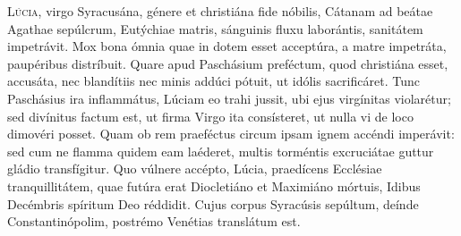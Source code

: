 \lettrine{L}{úcia}, virgo Syracusána,
génere et christiána fide nóbilis,
Cátanam ad beátae Agathae sepúlcrum,
Eutýchiae matris, sánguinis fluxu laborántis,
sanitátem impetrávit.
Mox bona ómnia quae in dotem esset acceptúra,
a matre impetráta, paupéribus distríbuit.
Quare apud Paschásium preféctum, quod christiána esset, accusáta,
nec blandítiis nec minis addúci pótuit, ut idólis sacrificáret.
Tunc Paschásius ira inflammátus, Lúciam eo trahi jussit,
ubi ejus virgínitas violarétur;
sed divínitus factum est, ut firma Virgo ita consísteret,
ut nulla vi de loco dimovéri posset.
Quam ob rem praeféctus circum ipsam ignem accéndi imperávit:
sed cum ne flamma quidem eam laéderet,
multis torméntis excruciátae guttur gládio transfígitur.
Quo vúlnere accépto, Lúcia, praedícens Ecclésiae tranquillitátem,
quae futúra erat Diocletiáno et Maximiáno mórtuis,
Idibus Decémbris spíritum Deo réddidit.
Cujus corpus Syracúsis sepúltum,
deínde Constantinópolim, postrémo Venétias translátum est.

\parsTeDeum


